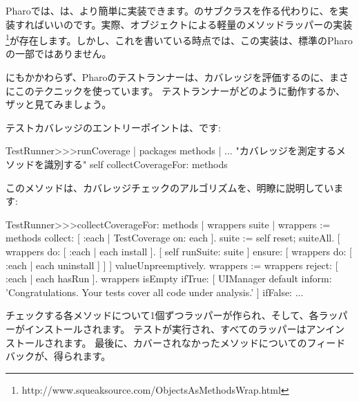 \documentclass[a4paper,10pt,twoside]{book}
\begin{document}
Pharoでは、は、より簡単に実装できます。のサブクラスを作る代わりに、を実装すればいいのです。実際、オブジェクトによる軽量のメソッドラッパーの実装\footnote{http://www.squeaksource.com/ObjectsAsMethodsWrap.html}が存在します。しかし、これを書いている時点では、この実装は、標準のPharoの一部ではありません。

にもかかわらず、Pharoのテストランナーは、カバレッジを評価するのに、まさにこのテクニックを使っています。
テストランナーがどのように動作するか、ザッと見てみましょう。

テストカバレッジのエントリーポイントは、です:
\begin{code}{}
TestRunner>>>runCoverage
	| packages methods |
	... "カバレッジを測定するメソッドを識別する" %
	self collectCoverageFor: methods
\end{code}

このメソッドは、カバレッジチェックのアルゴリズムを、明瞭に説明しています:
\begin{code}{}
TestRunner>>>collectCoverageFor: methods
	| wrappers suite |
	wrappers := methods collect: [ :each | TestCoverage on: each ].
	suite := self
		reset;
		suiteAll.
	[ wrappers do: [ :each | each install ].
	  [ self runSuite: suite ] ensure: [ wrappers do: [ :each | each uninstall ] ] ] valueUnpreemptively.
	wrappers := wrappers reject: [ :each | each hasRun ].
	wrappers isEmpty 
		ifTrue: 
			[ UIManager default inform: 'Congratulations. Your tests cover all code under analysis.' ]
		ifFalse: ...
\end{code}
チェックする各メソッドについて1個ずつラッパーが作られ、そして、各ラッパーがインストールされます。
テストが実行され、すべてのラッパーはアンインストールされます。
最後に、カバーされなかったメソッドについてのフィードバックが、得られます。
\end{document}
